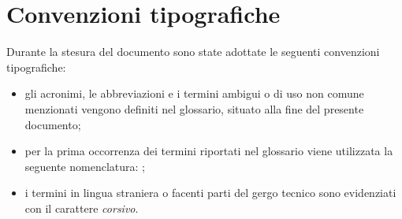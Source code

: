 \section{Convenzioni tipografiche}
\label{sec:convenzioni tipografiche}
Durante la stesura del documento sono state adottate le seguenti convenzioni
tipografiche:
\begin{itemize}
      \item gli acronimi, le abbreviazioni e i termini ambigui o di uso non
            comune menzionati vengono definiti nel glossario, situato alla fine
            del
            presente documento;
      \item per la prima occorrenza dei termini riportati nel glossario viene
            utilizzata la seguente nomenclatura:
            {\color{RoyalBlue}{parola\glsfirstoccur}};
      \item i termini in lingua straniera o facenti parti del gergo tecnico
            sono evidenziati con il carattere \emph{corsivo}.
\end{itemize}